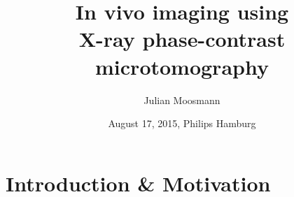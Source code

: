 \documentclass{beamer}
\title[X-ray phase-contrast tomography]{In vivo imaging using \\X-ray
  phase-contrast microtomography}
\author{Julian Moosmann}
\date{August 17, 2015, Philips Hamburg}
\begin{document}

\begin{frame}
  \titlepage
\end{frame}


\section{Introduction \& Motivation}
\label{sec:intro}
\end{document}

